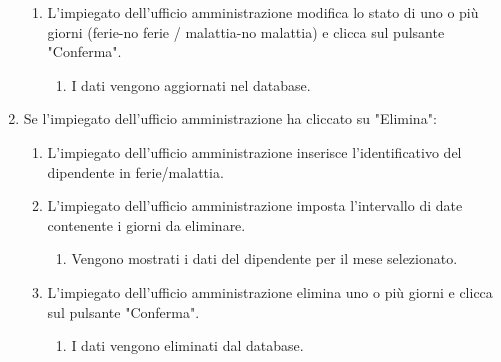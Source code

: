 \begin{enumerate}
\begin{enumerate}
			\item L'impiegato dell'ufficio amministrazione modifica lo stato di uno o più giorni (ferie-no ferie / malattia-no malattia) e clicca sul pulsante "Conferma".
				\begin{enumerate}
					\item I dati vengono aggiornati nel database.
				\end{enumerate}
		\end{enumerate}
	\item Se l'impiegato dell'ufficio amministrazione ha cliccato su "Elimina":
		\begin{enumerate}
			\item L'impiegato dell'ufficio amministrazione inserisce l'identificativo del dipendente in ferie/malattia.
			\item L'impiegato dell'ufficio amministrazione imposta l'intervallo di date contenente i giorni da eliminare.
				\begin{enumerate}
					\item Vengono mostrati i dati del dipendente per il mese selezionato.
				\end{enumerate}
			\item L'impiegato dell'ufficio amministrazione elimina uno o più giorni e clicca sul pulsante "Conferma".
				\begin{enumerate}
					\item I dati vengono eliminati dal database.
				\end{enumerate}
		\end{enumerate}	
\end{enumerate}
